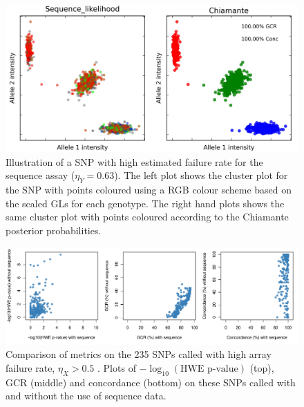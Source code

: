 \begin{figure}[p]
  \begin{center} 
    \includegraphics[width=\textwidth]{chap2figs/Fig5}
    \caption[Illustration of a SNP with high estimated sequence failure]{Illustration of a SNP with high estimated failure rate for the sequence assay ($\eta_Y = 0.63$). The left plot shows the cluster plot for the SNP with points coloured using a RGB colour scheme based on the scaled GLs for each genotype. The right hand plots shows the same cluster plot with points coloured according to the Chiamante posterior probabilities.\label{seq_fail_1}}
  \end{center} 
\end{figure}



\begin{figure}[p]
  \begin{center} 
    \includegraphics[width=\textwidth]{chap2figs/SupFig11}
    \caption[Evaluation of genotype calling when array data is problematic]{Comparison of metrics on the 235 SNPs called with high array failure rate, $\eta_X> 0.5$ . Plots of $-\log_{10}(\textrm{HWE p-value})$ (top), GCR (middle) and concordance (bottom) on these SNPs called with and without the use of sequence data.
      \label{chap2:results:eta_array}}
  \end{center} 
\end{figure}

